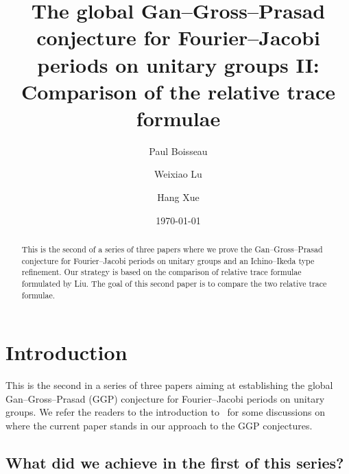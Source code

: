 \documentclass[letterpaper,11pt]{amsart}
\newcommand{\<}{\negthickspace}
\theoremstyle{definition}
\theoremstyle{plain}
\theoremstyle{remark}
\numberwithin{equation}{section}
\begin{document}
\title{The global Gan--Gross--Prasad conjecture for Fourier--Jacobi periods on unitary groups II: Comparison of the relative trace formulae}

\author{Paul Boisseau}

\author{Weixiao Lu}

\author{Hang Xue}

\address{Paul Boisseau, Max Planck Institute for Mathematics, Vivatsgasse 7, 53111 Bonn, Germany}


\address{Weixiao Lu, Aix Marseille Univ, CNRS, I2M, Marseille, 13009, France}

\address{Hang Xue, Department of Mathematics, The University of Arizona, Tucson, AZ, 85721, USA}



\date{\today}

\begin{abstract}
This is the second of a series of three papers where we prove the Gan--Gross--Prasad conjecture for Fourier--Jacobi periods on unitary groups and an Ichino--Ikeda type refinement. Our strategy is based on the comparison of relative trace formulae formulated by Liu. The goal of this second paper is to compare the two relative trace formulae.
\end{abstract}

\maketitle

\tableofcontents


\section{Introduction}

This is the second in a series of three papers aiming at establishing the global Gan--Gross--Prasad (GGP) conjecture for Fourier--Jacobi periods on unitary groups. 
We refer the readers to the introduction to~\cite{BLX1} for some discussions on where the current paper stands in our approach to the GGP conjectures.



\subsection{What did we achieve in the first of this series?}
\end{document}
